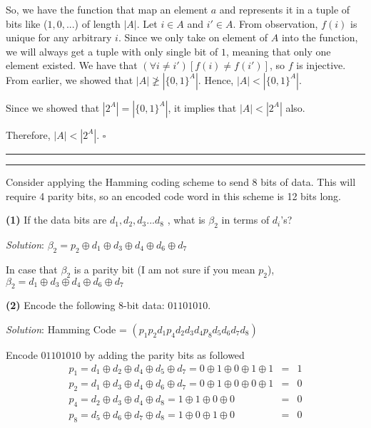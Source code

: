 \documentclass[a4paper, 11pt]{article}
\newcommand{\question}[2] {\vspace{.25in} \hrule\vspace{0.5em}
	\noindent{\bf #1: #2} \vspace{0.5em}
	\hrule \vspace{.10in}}
\renewcommand{\part}[1] {\vspace{.10in} {\bf (#1)}}
\begin{document}
	So, we have the function that map an element $a$ and represents it in a tuple of bits like ($1,0,...$) of length $|A|$.
	Let $i \in A$ and $i' \in A$. From observation, $f(i)$ is unique for any arbitrary $i$. Since we only take on element of $A$ into the function, we will always get a tuple with only single bit of $1$, meaning that only one element existed. We have that $ ( \forall i \neq i')[ f(i) \neq f(i')]$, so $f$ is injective. From earlier, we showed that $|A| \ngeq |\{0, 1\}^A|$. Hence,  $|A| < |\{0, 1\}^A|$.
	
	Since we showed that $|2^A| = |\{0, 1\}^A|$, it implies that $|A| < |2^A|$ also.

	Therefore, $|A| < |2^A|$. $\square$
	
	\question{3}{Hamming Code}
	
	Consider applying the Hamming coding scheme to send 8 bits of data. This will require 4 parity bits, so an encoded code word in this scheme is 12 bits long.
	
	\part{1} If the data bits are $d_1,d_2,d_3...d_8$ , what is $\beta_2$ in terms of $d_i$’s?
	
	{\em Solution}: $\beta_2 = p_2 \oplus d_1 \oplus d_3 \oplus d_4 \oplus d_6 \oplus d_7$
	
	In case that $\beta_2$ is a parity bit (I am not sure if you mean $p_2$), $\beta_2 = d_1 \oplus d_3 \oplus d_4 \oplus d_6 \oplus d_7$
	
	\part{2} Encode the following 8-bit data: $01101010$.
	
	{\em Solution}: Hamming Code = $(p_1 p_2 d_1 p_4 d_2 d_3 d_4 p_8 d_5 d_6 d_7 d_8)$
	
	Encode $01101010$ by adding the parity bits as followed
	\begin{eqnarray}
	p_1 = d_1 \oplus d_2 \oplus d_4 \oplus d_5 \oplus d_7 = 0 \oplus 1 \oplus 0 \oplus 1 \oplus 1 &=& 1\\
	p_2 = d_1 \oplus d_3 \oplus d_4 \oplus d_6 \oplus d_7  = 0 \oplus 1 \oplus 0 \oplus 0 \oplus 1 &=& 0\\
	p_4 = d_2 \oplus d_3 \oplus d_4 \oplus d_8 = 1 \oplus 1 \oplus 0 \oplus 0 &=& 0\\
	p_8 = d_5 \oplus d_6 \oplus d_7 \oplus d_8 = 1 \oplus 0 \oplus 1 \oplus 0 &=& 0
	\end{eqnarray}
	
\end{document}

